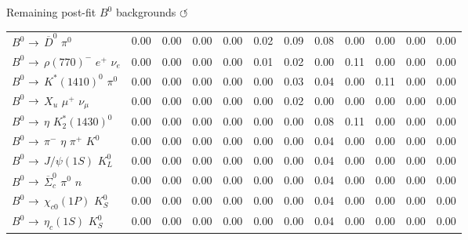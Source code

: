 \documentclass[xcolor=dvipsnames]{beamer}
\begin{document}
\begin{frame}{Remaining post-fit $B^0$ backgrounds \hyperlink{frame:A}{$\circlearrowleft$}}
{{\begin{tabular}{lrrrrrrrrrrr}
      $B^{0}$ $\rightarrow$ $\overline{D}^{0}$ $\pi^{0}$              &         0.00 &         0.00 &         0.00 &         0.00 &         0.02 &         0.09 &         0.08 &         0.00 &         0.00 &         0.00 &         0.00 \\
      $B^{0}$ $\rightarrow$ $\rho(770)^{-}$ $e^{+}$ $\nu_{e}$         &         0.00 &         0.00 &         0.00 &         0.00 &         0.01 &         0.02 &         0.00 &         0.11 &         0.00 &         0.00 &         0.00 \\
      $B^{0}$ $\rightarrow$ $K^{*}(1410)^{0}$ $\pi^{0}$               &         0.00 &         0.00 &         0.00 &         0.00 &         0.00 &         0.03 &         0.04 &         0.00 &         0.11 &         0.00 &         0.00 \\
      $B^{0}$ $\rightarrow$ $X_u$ $\mu^{+}$ $\nu_{\mu}$                 &         0.00 &         0.00 &         0.00 &         0.00 &         0.00 &         0.02 &         0.00 &         0.00 &         0.00 &         0.00 &         0.00 \\
      $B^{0}$ $\rightarrow$ $\eta$ $K_{2}^{*}(1430)^{0}$              &         0.00 &         0.00 &         0.00 &         0.00 &         0.00 &         0.00 &         0.08 &         0.11 &         0.00 &         0.00 &         0.00 \\
      $B^{0}$ $\rightarrow$ $\pi^{-}$ $\eta$ $\pi^{+}$ $K^{0}$        &         0.00 &         0.00 &         0.00 &         0.00 &         0.00 &         0.00 &         0.04 &         0.00 &         0.00 &         0.00 &         0.00 \\
      $B^{0}$ $\rightarrow$ $J/\psi(1S)$ $K_{L}^{0}$                  &         0.00 &         0.00 &         0.00 &         0.00 &         0.00 &         0.00 &         0.04 &         0.00 &         0.00 &         0.00 &         0.00 \\
      $B^{0}$ $\rightarrow$ $\overline{\Sigma}_{c}^{0}$ $\pi^{0}$ $n$ &         0.00 &         0.00 &         0.00 &         0.00 &         0.00 &         0.00 &         0.04 &         0.00 &         0.00 &         0.00 &         0.00 \\
      $B^{0}$ $\rightarrow$ $\chi_{c0}(1P)$ $K_{S}^{0}$               &         0.00 &         0.00 &         0.00 &         0.00 &         0.00 &         0.00 &         0.04 &         0.00 &         0.00 &         0.00 &         0.00 \\
      $B^{0}$ $\rightarrow$ $\eta_{c}(1S)$ $K_{S}^{0}$                &         0.00 &         0.00 &         0.00 &         0.00 &         0.00 &         0.00 &         0.04 &         0.00 &         0.00 &         0.00 &         0.00 \\

\end{tabular}}}
\end{frame}
\end{document}
